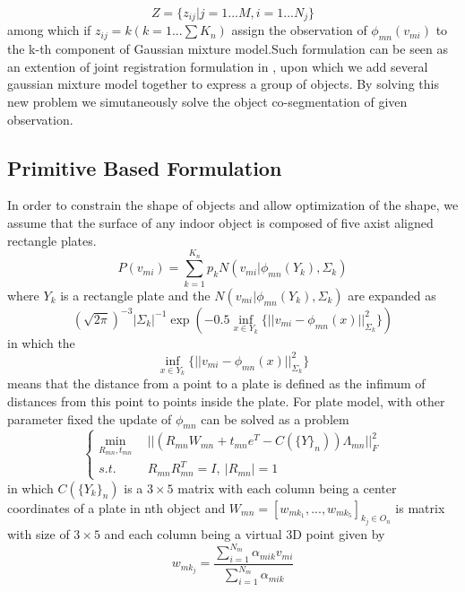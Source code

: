 $$Z=\{z_{ij}|j=1...M,i=1...N_j\}$$
among which if $z_{ij}=k(k=1...\sum{K_n})$ assign the observation of $\phi_{mn}(v_{mi})$ to the k-th component of Gaussian mixture model.Such formulation can be seen as an extention of joint registration formulation in \cite{Evangelidis2014}, upon which we add several gaussian mixture model together to express a group of objects. By solving this new problem we simutaneously solve  the object co-segmentation of given observation.
\subsection{Primitive Based Formulation}
In order to constrain the shape of objects and allow optimization of the shape, we assume that the surface of any indoor object is composed of five axist aligned rectangle plates.
\begin{equation}
\label{equ:hough}
P(v_{mi})=\sum^{K_n}_{k=1}p_kN(v_{mi}|\phi_{mn}(Y_k),\Sigma_k)
\end{equation}
where $Y_k$ is a rectangle plate and the $N(v_{mi}|\phi_{mn}(Y_k),\Sigma_k)$ are expanded as
$$
(\sqrt{2\pi})^{-3}|\Sigma_k|^{-1}\exp(-0.5\inf_{x\in Y_k}\{||v_{mi}-\phi_{mn}(x)||^2_{\Sigma_k}\})
$$
in which the $$\inf_{x \in Y_k}\{||v_{mi}-\phi_{mn}(x)||^2_{\Sigma_k}\}$$ means that the distance from a point to a plate is defined as the infimum of distances from this point to points inside the plate. 
For plate model, with other parameter fixed the update of $\phi_{mn}$ can be solved as a problem
\begin{equation}
\left\{
\begin{aligned}
\min_{R_{mn},t_{mn}}~&~|| (R_{mn}W_{mn} + t_{mn}e^{T} - C(\{Y\}_n))\Lambda_{mn}||^2_{F} \\
s.t.~&~R_{mn}R_{mn}^{T}=I,~|R_{mn}|=1
\end{aligned}
\right.
\end{equation}
in which $C(\{Y_k\}_n)$ is a $3 \times 5$ matrix with each column being a center coordinates of a plate in nth object
and $W_{mn}=[w_{mk_1},...,w_{mk_5}]_{k_j \in O_n}$ is matrix with size of $3 \times 5$ and each column being a virtual 3D point given by
$$w_{mk_j}=\frac{\sum^{N_m}_{i=1}\alpha_{mik}v_{mi}}{\sum^{N_m}_{i=1}\alpha_{mik}}$$
